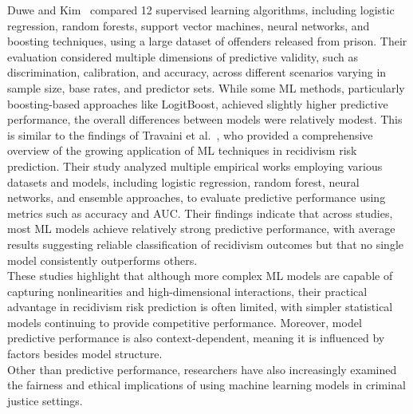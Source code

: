 \documentclass[12pt]{article}
\begin{document}
Duwe and Kim~\cite{duwe2017out} compared 12 supervised learning algorithms, including logistic regression, random forests, support vector machines, neural networks, and boosting techniques, using a large dataset of offenders released from prison. Their evaluation considered multiple dimensions of predictive validity, such as discrimination, calibration, and accuracy, across different scenarios varying in sample size, base rates, and predictor sets. While some ML methods, particularly boosting-based approaches like LogitBoost, achieved slightly higher predictive performance, the overall differences between models were relatively modest. This is similar to the findings of Travaini et al.~\cite{travaini2022machine}, who provided a comprehensive overview of the growing application of ML techniques in recidivism risk prediction. Their study analyzed multiple empirical works employing various datasets and models, including logistic regression, random forest, neural networks, and ensemble approaches, to evaluate predictive performance using metrics such as accuracy and AUC. Their findings indicate that across studies, most ML models achieve relatively strong predictive performance, with average results suggesting reliable classification of recidivism outcomes but that no single model consistently outperforms others.\\

These studies highlight that although more complex ML models are capable of capturing nonlinearities and high-dimensional interactions, their practical advantage in recidivism risk prediction is often limited, with simpler statistical models continuing to provide competitive performance. Moreover, model predictive performance is also context-dependent, meaning it is influenced by factors besides model structure.\\

Other than predictive performance, researchers have also increasingly examined the fairness and ethical implications of using machine learning models in criminal justice settings.\\
\end{document}

